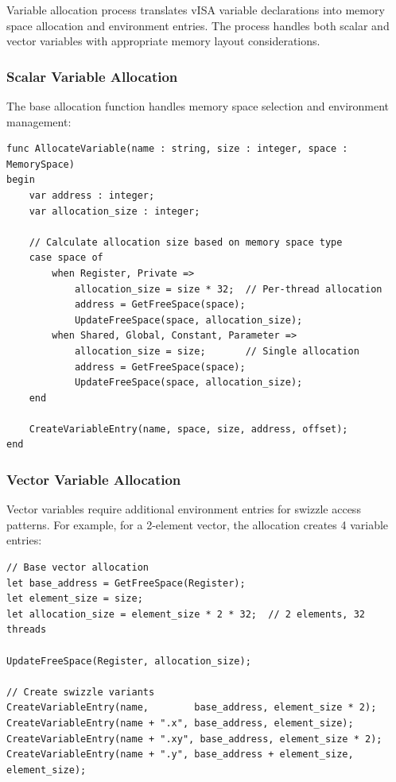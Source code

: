 Variable allocation process translates vISA variable declarations into memory
space allocation and environment entries. The process handles both scalar and
vector variables with appropriate memory layout considerations.

\subsubsection{Scalar Variable Allocation}
The base allocation function handles memory space selection and environment management:

\begin{lstlisting}[caption={Scalar Variable Allocation}, label={lst:scalar_allocation}]
func AllocateVariable(name : string, size : integer, space : MemorySpace)
begin
    var address : integer;
    var allocation_size : integer;

    // Calculate allocation size based on memory space type
    case space of 
        when Register, Private =>
            allocation_size = size * 32;  // Per-thread allocation
            address = GetFreeSpace(space);
            UpdateFreeSpace(space, allocation_size);
        when Shared, Global, Constant, Parameter =>
            allocation_size = size;       // Single allocation
            address = GetFreeSpace(space);
            UpdateFreeSpace(space, allocation_size);
    end

    CreateVariableEntry(name, space, size, address, offset);
end
\end{lstlisting}

\subsubsection{Vector Variable Allocation}
Vector variables require additional environment entries for swizzle access
patterns. For example, for a 2-element vector, the allocation creates 4
variable entries:

\begin{lstlisting}[caption={Vector Variable Swizzle Generation (v2 case)}, label={lst:vector_allocation}]
// Base vector allocation
let base_address = GetFreeSpace(Register);
let element_size = size;
let allocation_size = element_size * 2 * 32;  // 2 elements, 32 threads

UpdateFreeSpace(Register, allocation_size);

// Create swizzle variants
CreateVariableEntry(name,        base_address, element_size * 2);
CreateVariableEntry(name + ".x", base_address, element_size);
CreateVariableEntry(name + ".xy", base_address, element_size * 2);
CreateVariableEntry(name + ".y", base_address + element_size, element_size);
\end{lstlisting}

